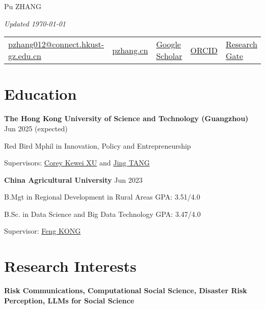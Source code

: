 \documentclass[letterpaper, 11pt]{article}
\begin{document}
\setlength{\parindent}{0pt}
\begin{center}
    \Huge Pu ZHANG
\end{center}
\hfill{\it\footnotesize Updated \today}

\vspace{0cm} 
\begin{center}
\begin{tabular}{lllll}
\href{mailto:pzhang012@connect.hkust-gz.edu.cn}{pzhang012@connect.hkust-gz.edu.cn} &
\hspace{0.1in} \href{https://pzhang.cn}{pzhang.cn} &
\hspace{0.1in} \href{https://scholar.google.com/citations?user=DBKpQPQAAAAJ}{Google Scholar} &
\hspace{0.1in} \href{https://orcid.org/0000-0002-7501-2124}{ORCID}&
\hspace{0.1in} \href{https://www.researchgate.net/profile/Pu-Zhang-33/}{Research Gate} \\
\end{tabular}
\end{center}

\section{Education}
\textbf{{The Hong Kong University of Science and Technology (Guangzhou)}} \hfill Jun 2025 (expected)

{Red Bird Mphil} in {Innovation, Policy and Entrepreneurship}

Supervisors: \href{https://facultyprofiles.hkust-gz.edu.cn/faculty-personal-page/XU-Kewei/coreyxu}{Corey Kewei XU} and \href{https://facultyprofiles.hkust-gz.edu.cn/faculty-personal-page/TANG-Jing/jingtang}{Jing TANG} 

\vspace{0.5em}
\textbf{{China Agricultural University}} \hfill Jun 2023

B.Mgt in Regional Development in Rural Areas \hfill{ GPA: 3.51/4.0}

B.Sc. in Data Science and Big Data Technology \hfill{ GPA: 3.47/4.0}

Supervisor: \href{https://cohd.cau.edu.cn/art/2020/11/27/art_48059_998984.html}{Feng KONG} 

\section{Research Interests}
\textbf{Risk Communications, Computational Social Science, Disaster Risk Perception, LLMs for Social Science}
\end{document}
